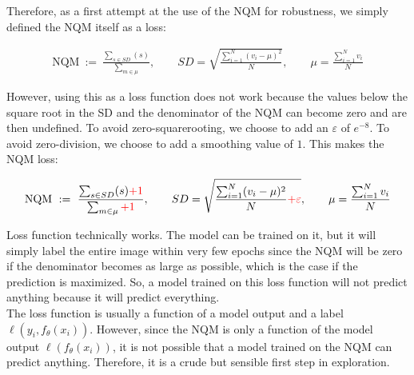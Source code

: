 \label{experiments:01.1:Only_NQM}
Therefore, as a first attempt at the use of the NQM for robustness, we simply defined the NQM itself as a loss:

\begin{align}
    \mathrm{NQM}\ :=\ \frac{\sum_{s\in SD} (s)} {\sum_{m\in\mu}}, \qquad
    SD = \sqrt{\frac{\sum^N_{i=1}(v_i-\mu)^2}  {N}}, \qquad
    \mu = \frac{\sum^N_{i=1}v_i}  {N}  
\end{align}

However, using this as a loss function does not work because the values below the square root in the SD and the denominator of the NQM can become zero and are then undefined.
To avoid zero-squarerooting, we choose to add an $\varepsilon$ of $e^{-8}$. To avoid zero-division, we choose to add a smoothing value of $1$. This makes the NQM loss:

\begin{align}
    \mathrm{NQM}\ :=\ \frac{\sum_{s\in SD} (s) {\color{red}+1}} {\sum_{m\in\mu} {\color{red}+1}}, \qquad
    SD = \sqrt{\frac{\sum^N_{i=1}(v_i-\mu)^2}  {N} {\color{red} + \varepsilon}}, \qquad
    \mu = \frac{\sum^N_{i=1}v_i}  {N}  
\end{align}


Loss function technically works. The model can be trained on it, but it will simply label the entire image within very few epochs since the NQM will be zero if the denominator becomes as large as possible, which is the case if the prediction is maximized. So, a model trained on this loss function will not predict anything because it will predict everything.\\
The loss function is usually a function of a model output and a label $\ell(y_i, f_\theta(x_i))$. However, since the NQM is only a function of the model output $\ell(f_\theta(x_i))$, it is not possible that a model trained on the NQM can predict anything. Therefore, it is a crude but sensible first step in exploration.


